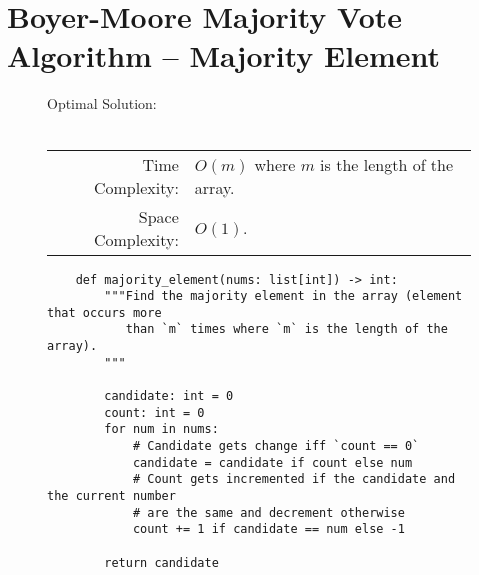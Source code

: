 
\section{Boyer-Moore Majority Vote Algorithm -- Majority Element}

\begin{figure}[H]
    Optimal Solution:\\\\
    \begin{tabular}{rl}
        Time Complexity:& \(O(m)\) where \(m\) is the length of the array.\\
        Space Complexity:& \(O(1)\).
    \end{tabular}
\end{figure}

\begin{figure}[H]
    \centering
    \begin{verbatim}
    def majority_element(nums: list[int]) -> int:
        """Find the majority element in the array (element that occurs more
           than `m` times where `m` is the length of the array).
        """

        candidate: int = 0
        count: int = 0
        for num in nums:
            # Candidate gets change iff `count == 0`
            candidate = candidate if count else num
            # Count gets incremented if the candidate and the current number
            # are the same and decrement otherwise
            count += 1 if candidate == num else -1

        return candidate
    \end{verbatim}
\end{figure}
